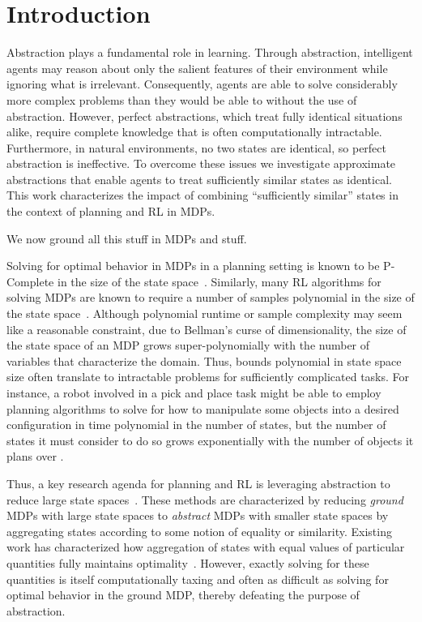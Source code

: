 \section{Introduction}
Abstraction plays a fundamental role in learning. Through abstraction, intelligent agents may reason about only the salient features of their environment while ignoring what is irrelevant. Consequently, agents are able to solve considerably more complex problems than they would be able to without the use of abstraction. However, perfect abstractions, which treat fully identical situations alike, require complete knowledge that is often computationally intractable. Furthermore, in natural environments, no two states are identical, so perfect abstraction is ineffective. To overcome these issues we investigate approximate abstractions that enable agents to treat sufficiently similar states as identical. This work characterizes the impact of combining ``sufficiently similar'' states in the context of planning and \ac{RL} in \acp{MDP}. 

We now ground all this stuff in MDPs and stuff.

Solving for optimal behavior in \acp{MDP} in a planning setting is known to be P-Complete in the size of the state space~\cite{papadimitriou1987complexity,littman1995complexity}. Similarly, many \ac{RL} algorithms for solving \acp{MDP} are known to require a number of samples polynomial in the size of the state space~\cite{strehl2009reinforcement}. Although polynomial runtime or sample complexity may seem like a reasonable constraint, due to Bellman's curse of dimensionality, the size of the state space of an \ac{MDP} grows super-polynomially with the number of variables that characterize the domain. Thus, bounds polynomial in state space size often translate to intractable problems for sufficiently complicated tasks.  For instance, a robot involved in a pick and place task might be able to employ planning algorithms to solve for how to manipulate some objects into a desired configuration in time polynomial in the number of states, but the number of states it must consider to do so grows exponentially with the number of objects it plans over .

Thus, a key research agenda for planning and \ac{RL} is leveraging abstraction to reduce large state spaces~\cite{andre2002state,jong2005state,dietterich2000hierarchical,Bean2011}. These methods are characterized by reducing \textit{ground} MDPs with large state spaces to \textit{abstract} MDPs with smaller state spaces by aggregating states according to some notion of equality or similarity. Existing work has characterized how aggregation of states with equal values of particular quantities fully maintains optimality~\cite{li2006towards,dean1997modelmin}. However, exactly solving for these quantities is itself computationally taxing and often as difficult as solving for optimal behavior in the ground \ac{MDP}, thereby defeating the purpose of abstraction.

